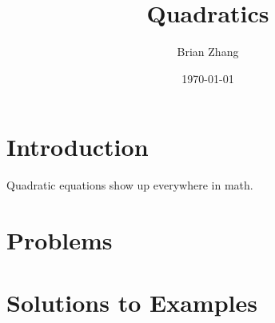 \documentclass[11pt]{scrartcl}
\title{Quadratics}
\author{Brian Zhang}
\date{\today}
\begin{document}
\maketitle

\section{Introduction}
Quadratic equations show up everywhere in math. 


\section{Problems}

\section{Solutions to Examples}
\end{document}
